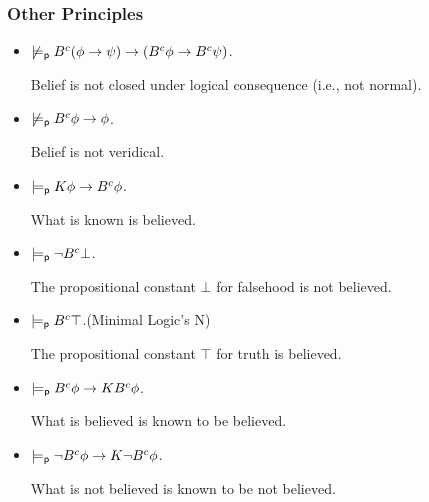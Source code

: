 \begin{frame}
  \frametitle{Other Principles}
  \begin{itemize}
  \item<+-> $\not\models_{\mathsf{p}} B^c(\phi\to\psi)\to(B^c\phi\to
    B^c\psi)$.

    Belief is not closed under logical consequence (i.e., not normal).

  \item<+-> $\not\models_{\mathsf{p}} B^c\phi\to\phi$.

    Belief is not veridical.

  \item<+-> $\models_{\mathsf{p}} K\phi\to B^c\phi$.

    What is known is believed.

  \item<+-> $\models_{\mathsf{p}}\lnot B^c\bot$.

    The propositional constant $\bot$ for falsehood is not believed.

  \item<+-> $\models_{\mathsf{p}} B^c\top$.\hfill(Minimal Logic's N)

    The propositional constant $\top$ for truth is believed.

  \item<+-> $\models_{\mathsf{p}} B^c\phi\to KB^c\phi$.

    What is believed is known to be believed.

  \item<+-> $\models_{\mathsf{p}} \lnot B^c\phi\to K\lnot
    B^c\phi$.

    What is not believed is known to be not believed.
  \end{itemize}
\end{frame}

